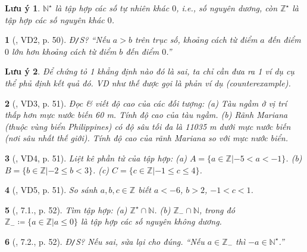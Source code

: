 \documentclass{article}
\newtheorem{baitoan}{}
\newtheorem{luuy}{Lưu ý}
\begin{document}
\begin{luuy}
	$\mathbb{N}^\star$ là tập hợp các số tự nhiên khác $0$, i.e., số nguyên dương, còn $\mathbb{Z}^\star$ là tập hợp các số nguyên khác $0$.
\end{luuy}

\begin{baitoan}[\cite{Binh_boi_duong_Toan_6_tap_1}, VD2, p. 50]
	{\rm Đ{\tt/}S?} ``Nếu $a > b$ trên trục số, khoảng cách từ điểm $a$ đến điểm $0$ lớn hơn khoảng cách từ điểm $b$ đến điểm $0$.''
\end{baitoan}

\begin{luuy}
	Để chứng tỏ 1 khẳng định nào đó là sai, ta chỉ cần đưa ra 1 ví dụ cụ thể phủ định kết quả đó. VD như thế được gọi là {\rm phản ví dụ (counterexample)}.
\end{luuy}

\begin{baitoan}[\cite{Binh_boi_duong_Toan_6_tap_1}, VD3, p. 51]
	Đọc \& viết độ cao của các đối tượng: (a) Tàu ngầm ở vị trí thấp hơn mực nước biến {\rm60 m}. Tính độ cao của tàu ngầm. (b) Rãnh Mariana (thuộc vùng biển Philippines) có độ sâu tối đa là {\rm11035 m} dưới mực nước biến (nơi sâu nhất thế giới). Tính độ cao của rãnh Mariana so với mực nước biển.
\end{baitoan}

\begin{baitoan}[\cite{Binh_boi_duong_Toan_6_tap_1}, VD4, p. 51]
	Liệt kê phần tử của tập hợp: (a) $A = \{a\in\mathbb{Z}|-5 < a < -1\}$. (b) $B = \{b\in\mathbb{Z}|-2\le b < 3\}$. (c) $C = \{c\in\mathbb{Z}|-1\le c\le4\}$.
\end{baitoan}

\begin{baitoan}[\cite{Binh_boi_duong_Toan_6_tap_1}, VD5, p. 51]
	So sánh $a,b,c\in\mathbb{Z}$ biết $a < -6$, $b > 2$, $-1 < c < 1$.
\end{baitoan}

\begin{baitoan}[\cite{Binh_boi_duong_Toan_6_tap_1}, 7.1., p. 52]
	Tìm tập hợp: (a) $\mathbb{Z}^\star\cap\mathbb{N}$. (b) $\mathbb{Z}_-\cap\mathbb{N}$, trong đó $\mathbb{Z}_-\coloneqq\{a\in\mathbb{Z}|a\le0\}$ là tập hợp các số nguyên không dương.
\end{baitoan}

\begin{baitoan}[\cite{Binh_boi_duong_Toan_6_tap_1}, 7.2., p. 52]
	{\rm Đ{\tt/}S?} Nếu sai, sửa lại cho đúng. ``Nếu $a\in\mathbb{Z}_-$ thì $-a\in\mathbb{N}^\star$.''
\end{baitoan}
\end{document}
